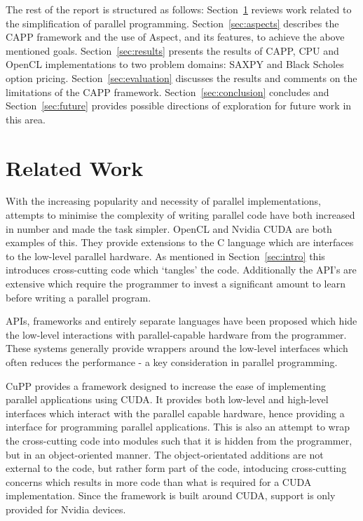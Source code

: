 \documentclass{sig-alternate-05-2015}
\begin{document}
The rest of the report is structured as follows: Section~\ref{sec:related}
reviews work related to the simplification of parallel programming.
Section~\ref{sec:aspects} describes the  CAPP framework and the use 
of Aspect\CPP, and its features, to achieve the above mentioned goals. Section~\ref{sec:results}
presents the results of CAPP, CPU and OpenCL implementations to two
problem domains:
SAXPY and Black Scholes option pricing.
Section~\ref{sec:evaluation} discusses the results and comments on the limitations 
of the  CAPP framework.
Section~\ref{sec:conclusion} concludes and Section~\ref{sec:future}
provides possible directions of exploration for future work in this area.

\section{Related Work}\label{sec:related}

With the increasing popularity and necessity of parallel implementations,
attempts to minimise the complexity of writing parallel code have both increased
in number and made the task simpler. OpenCL and Nvidia CUDA are both examples of
this. They provide extensions to the C language which are interfaces to the low-level
parallel hardware. As mentioned in Section~\ref{sec:intro} this
introduces cross-cutting code which `tangles' the \CPP code. Additionally the API's 
are extensive which require the programmer to invest a significant amount to
learn before writing a parallel program.

APIs, frameworks and entirely separate languages have been proposed which hide the low-level 
interactions with  parallel-capable hardware from the programmer.
These systems generally provide wrappers around the low-level interfaces 
which often reduces the performance - a key consideration in parallel
programming.

CuPP \cite{breit:cupp} provides a \CPP framework designed to increase the ease of implementing parallel
applications using CUDA. It provides both low-level and high-level interfaces
which interact with the parallel capable hardware, hence providing a \CPP
interface for programming parallel applications. This is also an attempt to wrap
the cross-cutting code into modules such that it is hidden from  the programmer,
but in an object-oriented manner. The object-orientated additions are not
external to the \CPP code, but rather form part of the \CPP code, intoducing
cross-cutting concerns which results in more code than what is required for a 
CUDA implementation. Since the framework is built around CUDA, support is only provided 
for Nvidia devices.
\end{document}
